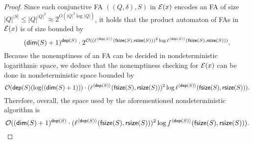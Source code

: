 \begin{proof}
%
Since each conjunctive FA $((Q, \delta), S)$ in $\mathcal{E}(x)$ encodes an FA of size $|Q|^{|S|} \le |Q|^{|Q|^2} \approx 2^{O(|Q|^2 \log |Q|)}$, 
it holds that the product automaton of FAs in $\mathcal{E}(x)$ is of size bounded by 
%
$$(\mathsf{dim}(S)+1)^{\mathsf{dep}(S)} \cdot 2^{\mathcal{O}((\ell^{\langle \mathsf{dep}(S) \rangle}(\mathsf{fsize}(S), \mathsf{rsize}(S)))^2 \log \ell^{\langle \mathsf{dep}(S) \rangle}(\mathsf{fsize}(S), \mathsf{rsize}(S)) )}.$$
%
Because the nonemptiness of an FA 
can be decided in nondeterministic logarithmic space, we deduce that the nonemptiness checking for $\mathcal{E}(x)$ can be done in nondeterministic space bounded by 
$$\mathcal{O}(\mathsf{dep}(S) (\log ((\mathsf{dim}(S)+1))) \cdot (\ell^{\langle \mathsf{dep}(S) \rangle}(\mathsf{fsize}(S), \mathsf{rsize}(S)))^2 \log \ell^{\langle \mathsf{dep}(S) \rangle}(\mathsf{fsize}(S), \mathsf{rsize}(S))).$$
%
Therefore, overall, the space used by the aforementioned nondeterministic algorithm is 
$$\mathcal{O}((\mathsf{dim}(S)+1)^{\mathsf{dep}(S)} \cdot  (\ell^{\langle \mathsf{dep}(S) \rangle}(\mathsf{fsize}(S), \mathsf{rsize}(S)))^2 \log f^{\langle \mathsf{dep}(S) \rangle}(\mathsf{fsize}(S), \mathsf{rsize}(S))).$$ 
\end{proof}
